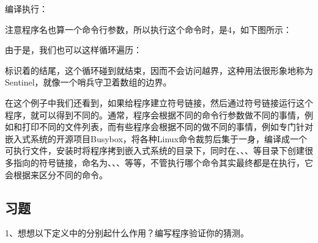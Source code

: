


编译执行：




注意程序名也算一个命令行参数，所以执行这个命令时，是4，如下图所示：




由于是，我们也可以这样循环遍历：




标识着的结尾，这个循环碰到就结束，因而不会访问越界，这种用法很形象地称为Sentinel，就像一个哨兵守卫着数组的边界。



在这个例子中我们还看到，如果给程序建立符号链接，然后通过符号链接运行这个程序，就可以得到不同的。通常，程序会根据不同的命令行参数做不同的事情，例如和打印不同的文件列表，而有些程序会根据不同的做不同的事情，例如专门针对嵌入式系统的开源项目Busybox，将各种Linux命令裁剪后集于一身，编译成一个可执行文件，安装时将程序拷到嵌入式系统的目录下，同时在、、、等目录下创建很多指向的符号链接，命名为、、、等等，不管执行哪个命令其实最终都是在执行，它会根据来区分不同的命令。


\subsection*{习题}
%


1、想想以下定义中的分别起什么作用？编写程序验证你的猜测。


